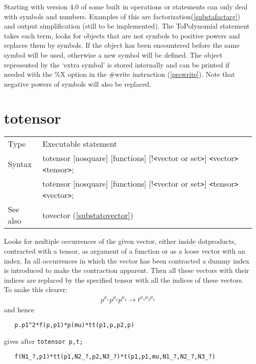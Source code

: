 \noindent Starting with version 4.0 of \FORM{} some built in operations or
statements can only deal with symbols and numbers. Examples of this are 
factorization(\ref{substafactarg}) and output simplification (still to be 
implemented). The ToPolynomial statement takes each term, looks for objects 
that are not symbols to positive powers and replaces them by symbols. If 
the object has been encountered before the same symbol will be used, 
otherwise a new symbol will be defined. The object represented by the 
`extra symbol' is stored internally and can be printed if needed with the 
\%X option in the \#write instruction (\ref{prewrite}). Note that negative 
powers of symbols will also be replaced.
\vspace{10mm}


\section{totensor}
\label{substatotensor}

\noindent \begin{tabular}{ll}
Type & Executable statement\\
Syntax & totensor [nosquare] [functions] [!{\tt<}vector or set{\tt>}] {\tt<}vector{\tt>} {\tt<}tensor{\tt>}; \\
       & totensor [nosquare] [functions] [!{\tt<}vector or set{\tt>}] {\tt<}tensor{\tt>} {\tt<}vector{\tt>};
\\ See also & tovector (\ref{substatovector})
\end{tabular} \vspace{4mm}

\noindent Looks for multiple occurrences of the given 
vector, either inside dotproducts, contracted with a tensor, as argument of 
a function or as a loose vector with an index. In all occurrences in 
which the vector has been contracted a dummy index is introduced to make 
the contraction apparent. Then all these vectors with their indices are 
replaced by the specified tensor with all the indices of these vectors. To 
make this clearer:
\begin{eqnarray}
    p^{\mu_1}p^{\mu_2}p^{\mu_3} \rightarrow t^{\mu_1\mu_2\mu_3} \nonumber
\end{eqnarray}
\setcounter{equation}{6}
and hence
\begin{verbatim}
   p.p1^2*f(p,p1)*p(mu)*tt(p1,p,p2,p)
\end{verbatim}
gives after \verb:totensor p,t;:
\begin{verbatim}
   f(N1_?,p1)*tt(p1,N2_?,p2,N3_?)*t(p1,p1,mu,N1_?,N2_?,N3_?)
\end{verbatim}\vspace{4mm}

